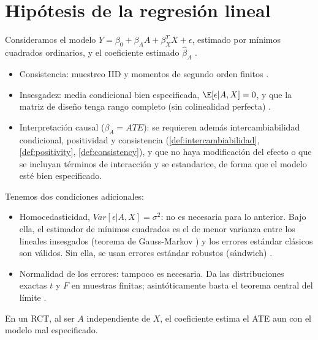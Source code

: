 
\chapter{Hipótesis de la regresión lineal}\label{ap:hipotesis-regresion}
Consideramos el modelo $Y = \beta_0 + \beta_A A + \beta_X^T X + \epsilon$, estimado por mínimos cuadrados
ordinarios, y el coeficiente estimado $\hat\beta_A$ \cite[3.1]{raoLinearModels2008}.

\begin{itemize}
    \item Consistencia: muestreo IID y momentos de segundo orden finitos \cite[3.7]{raoLinearModels2008}.
    \item Insesgadez: media condicional bien especificada, $\E[\epsilon | A, X] = 0$,
          y que la matriz de diseño tenga rango completo (sin colinealidad perfecta) \cite[3.4]{raoLinearModels2008}.
    \item Interpretación causal ($\beta_A = ATE$): se requieren además intercambiabilidad condicional,
          positividad y consistencia (\autoref{def:intercambiabilidad}, \autoref{def:positivity},
          \autoref{def:consistency}), y que no haya modificación del efecto o que se incluyan
          términos de interacción y se estandarice, de forma que el modelo esté bien especificado.
\end{itemize}

Tenemos dos condiciones adicionales:

\begin{itemize}
    \item Homocedasticidad, $Var[\epsilon | A, X] = \sigma^2$: no es necesaria para lo anterior.
          Bajo ella, el estimador de mínimos cuadrados es el de menor varianza entre los lineales insesgados
          (teorema de Gauss-Markov \cite[3.4]{raoLinearModels2008}) y los errores estándar clásicos son válidos. Sin ella, se usan errores
          estándar robustos (sándwich) \cite[4.3]{raoLinearModels2008}.
    \item Normalidad de los errores: tampoco es necesaria. Da las distribuciones exactas $t$ y $F$
          en muestras finitas; asintóticamente basta el teorema central del límite \cite[3.6]{raoLinearModels2008}.
\end{itemize}

En un RCT, al ser $A$ independiente de $X$, el coeficiente estima el ATE aun con el modelo
mal especificado.
